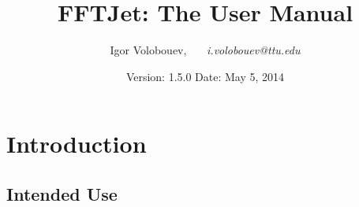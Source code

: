 \documentclass[epsf,12pt,titlepage]{article}
\begin{document}
\title{FFTJet: The User Manual}

\author{Igor Volobouev, \ \ \ {\it i.volobouev@ttu.edu}}
\date{Version: 1.5.0 \hspace{1.5cm} Date: May 5, 2014}
\maketitle

\tableofcontents

\newpage
\section{Introduction}

\subsection{Intended Use}
\end{document}
